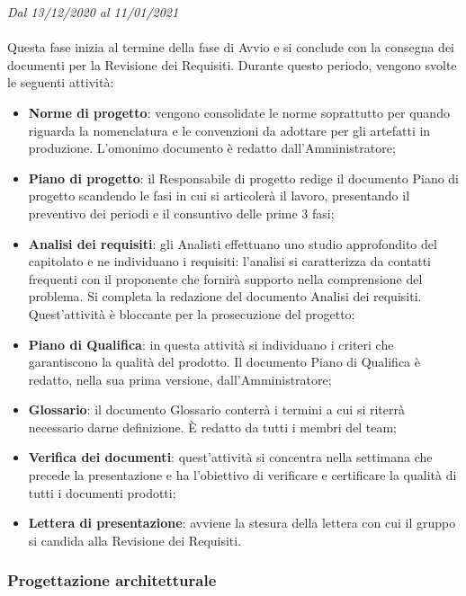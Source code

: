 \textit{Dal 13/12/2020 al 11/01/2021}
\\\\
Questa fase inizia al termine della fase di Avvio e si conclude con la consegna dei documenti per la Revisione dei Requisiti.
Durante questo periodo, vengono svolte le seguenti attività:
\begin{itemize}
	\item \textbf{Norme di progetto}: vengono consolidate le norme soprattutto per quando riguarda la nomenclatura e le convenzioni da adottare per gli artefatti in produzione. L'omonimo documento è redatto dall'Amministratore;
	\item \textbf{Piano di progetto}: il Responsabile di progetto redige il documento Piano di progetto scandendo le fasi in cui si articolerà il lavoro, presentando il preventivo dei periodi e il consuntivo delle prime 3 fasi;
	\item \textbf{Analisi dei requisiti}: gli Analisti effettuano uno studio approfondito del capitolato e ne individuano i requisiti: l'analisi si caratterizza da contatti frequenti con il proponente che fornirà supporto nella comprensione del problema. Si completa la redazione del documento Analisi dei requisiti. Quest'attività è bloccante per la prosecuzione del progetto;
	\item \textbf{Piano di Qualifica}: in questa attività si individuano i criteri che garantiscono la qualità del prodotto. Il documento Piano di Qualifica è redatto, nella sua prima versione, dall'Amministratore;
	\item \textbf{Glossario}: il documento Glossario conterrà i termini a cui si riterrà necessario darne definizione. \`E redatto da tutti i membri del team;
	\item \textbf{Verifica dei documenti}: quest'attività si concentra nella settimana che precede la presentazione e ha l'obiettivo di verificare e certificare la qualità di tutti i documenti prodotti;
	\item \textbf{Lettera di presentazione}: avviene la stesura della lettera con cui il gruppo si candida alla Revisione dei Requisiti.
\end{itemize}



\subsubsection{Progettazione architetturale}

